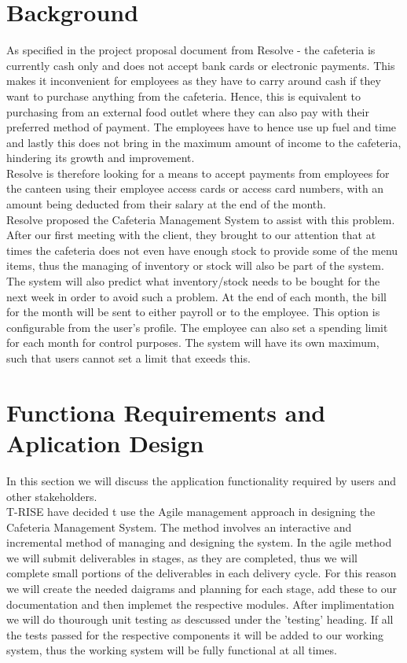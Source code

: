 \documentclass[12pt]{article}
\begin{document}
\section{Background}
As specified in the project proposal document from Resolve - the cafeteria is currently cash only and does not accept bank cards or electronic payments. This makes it inconvenient for employees as they have to carry around cash if they want to purchase anything from the cafeteria. Hence, this is equivalent to purchasing from an external food outlet where they can also pay with their preferred method of payment. The employees have to hence use up fuel and time and lastly this does not bring in the maximum amount of income to the cafeteria, hindering its growth and improvement.\\

Resolve is therefore looking for a means to accept payments from employees for the canteen using their employee access cards or access card numbers, with an amount being deducted from their salary at the end of the month.\\

Resolve proposed the Cafeteria Management System to assist with this problem.
After our first meeting with the client, they brought to our attention that at times the cafeteria does not even have enough stock to provide some of the menu items, thus the managing of inventory or stock will also be part of the system. The system will also predict what inventory/stock needs to be bought for the next week in order to avoid such a problem. At the end of each month, the bill for the month will be sent to either payroll or to the employee. This option is configurable from the user's profile. The employee can also set a spending limit for each month for control purposes. The system will have its own maximum, such that users cannot set a limit that exeeds this. 



\section{Functiona Requirements and Aplication Design}
In this section we will discuss the application functionality required by users and other stakeholders. \\
T-RISE have decided t use the Agile management approach in designing the Cafeteria Management System. The method involves an interactive and incremental method of managing and designing the system. In the agile method we will submit deliverables in stages, as they are completed, thus we will complete small portions of the deliverables in each delivery cycle. 
For this reason we will create the needed daigrams and planning for each stage, add these to our documentation and then implemet the respective modules. After implimentation we will do thourough unit testing as descussed under the 'testing' heading. If all the tests passed for the respective components it will be added to our working system, thus the working system will be fully functional at all times. 
\end{document}
